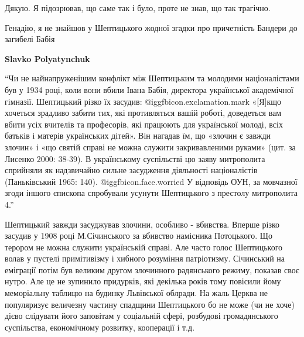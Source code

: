  
 
 
 
 
\zzSecCmt

\begin{itemize} %
Дякую. Я підозрював, що саме так і було, проте не знав, що так трагічно.

Генадію, я не знайшов у Шептицького жодної згадки про причетність Бандери до загибелі Бабія

\begin{itemize} %
\textbf{Slavko Polyatynchuk} 

\enquote{Чи не найнапруженішим конфлікт між Шептицьким та молодими націоналістами був у
1934 році, коли вони вбили Івана Бабія, директора української академічної
гімназії. Шептицький різко їх засудив: @igg{fbicon.exclamation.mark} «[Я]кщо хочеться зрадливо забити тих,
які противляться вашій роботі, доведеться вам вбити усіх вчителів та
професорів, які працюють для української молоді, всіх батьків і матерів
українських дітей». Він нагадав їм, що «злочин є завжди злочин» і «що святій
справі не можна служити закривавленими руками» (цит. за Лисенко 2000: 38-39). В
українському суспільстві цю заяву митрополита сприйняли як надзвичайно сильне
засудження діяльності націоналістів (Паньківський 1965: 140).  @igg{fbicon.face.worried} У відповідь
ОУН, за мовчазної згоди іншого єпископа спробували усунути Шептицького з
престолу митрополита 4.}

\end{itemize} %


Шептицький завжди засуджував злочини, особливо - вбивства. Вперше різко засудив
у 1908 році М.Січинського за вбивство намісника Потоцького. Що терором не можна
служити українській справі. Але часто голос Шептицького волав у пустелі
примітивізму і хибного розуміння патріотизму. Січинський на еміграції потім був
великим другом злочинного радянського режиму, показав своє нутро. Але це не
зупинило придурків, які декілька років тому повісили йому меморіальну таблицю
на будинку Львівської облради. На жаль Церква не популяризує величезну частину
спадщини Шептицького бо не може (чи не хоче) дієво слідувати його заповітам у
соціальній сфері, розбудові громадянського суспільства, економічному розвитку,
кооперації і т.д.


\end{itemize}
